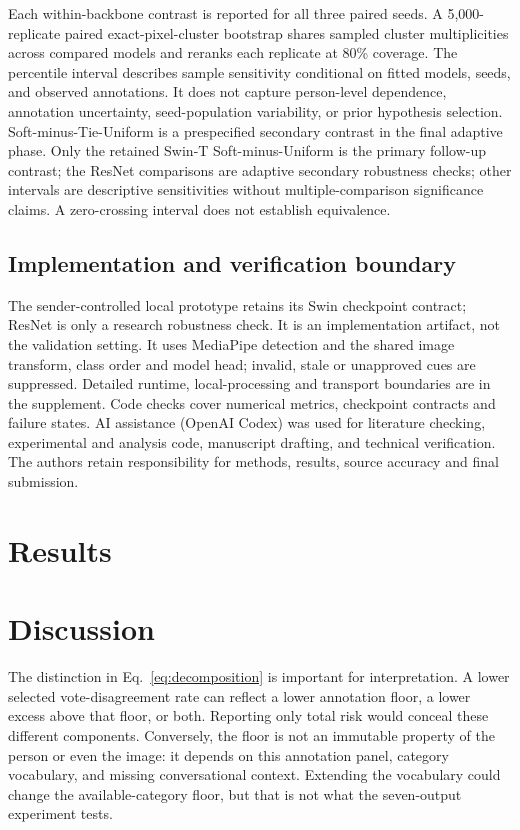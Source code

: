 \documentclass[pdflatex,sn-mathphys-num]{sn-jnl}
\begin{document}
Each within-backbone contrast is reported for all three paired seeds. A 5,000-replicate paired exact-pixel-cluster bootstrap shares sampled cluster multiplicities across compared models and reranks each replicate at 80\% coverage. The percentile interval describes sample sensitivity conditional on fitted models, seeds, and observed annotations. It does not capture person-level dependence, annotation uncertainty, seed-population variability, or prior hypothesis selection. Soft-minus-Tie-Uniform is a prespecified secondary contrast in the final adaptive phase. Only the retained Swin-T Soft-minus-Uniform is the primary follow-up contrast; the ResNet comparisons are adaptive secondary robustness checks; other intervals are descriptive sensitivities without multiple-comparison significance claims. A zero-crossing interval does not establish equivalence.

\subsection{Implementation and verification boundary}
The sender-controlled local prototype retains its Swin checkpoint contract; ResNet is only a research robustness check. It is an implementation artifact, not the validation setting. It uses MediaPipe detection \cite{lugaresi2019mediapipe} and the shared image transform, class order and model head; invalid, stale or unapproved cues are suppressed. Detailed runtime, local-processing and transport boundaries are in the supplement. Code checks cover numerical metrics, checkpoint contracts and failure states. AI assistance (OpenAI Codex) was used for literature checking, experimental and analysis code, manuscript drafting, and technical verification. The authors retain responsibility for methods, results, source accuracy and final submission.

\section{Results}


\section{Discussion}


The distinction in Eq.~\ref{eq:decomposition} is important for interpretation. A lower selected vote-disagreement rate can reflect a lower annotation floor, a lower excess above that floor, or both. Reporting only total risk would conceal these different components. Conversely, the floor is not an immutable property of the person or even the image: it depends on this annotation panel, category vocabulary, and missing conversational context. Extending the vocabulary could change the available-category floor, but that is not what the seven-output experiment tests.
\end{document}

